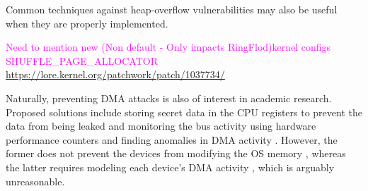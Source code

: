 

Common techniques against heap-overflow vulnerabilities may also be useful when they are properly implemented. 


 
\textcolor{magenta}{Need to mention new (Non default - Only impacts RingFlod)kernel configs SHUFFLE\_PAGE\_ALLOCATOR \url{https://lore.kernel.org/patchwork/patch/1037734/}}








Naturally, preventing DMA attacks is also of interest in academic research. Proposed solutions include storing secret data in the CPU registers to prevent the data from being leaked \cite{MFD11, CZG15, Sim11} and monitoring the bus activity using hardware performance counters and finding anomalies in DMA activity \cite{Ste13}. However, the former does not prevent the devices from modifying the OS memory \cite{BR12}, whereas the latter requires modeling each device’s DMA activity \cite{Ste14}, which is arguably unreasonable.

